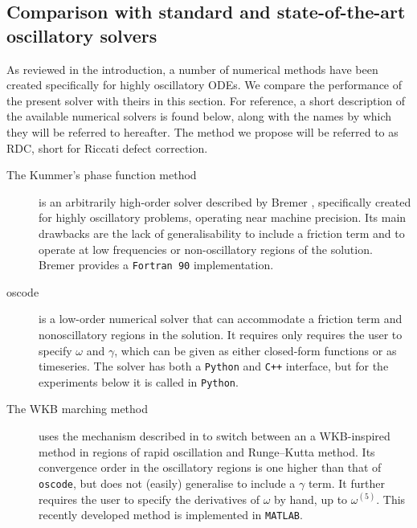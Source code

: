 \documentclass[10pt]{article}
\newcommand{\om}{\omega}
\newcommand{\g}{\gamma}
\newcommand{\AB}[1]{{\color{orange}#1}}
\begin{document}
\subsection{Comparison with standard and state-of-the-art oscillatory solvers \label{solvercomp}}

As reviewed in the introduction, a number of numerical methods have been
created specifically for highly oscillatory ODEs. We compare the performance of
the present solver with theirs in this section. For reference, a short
description of the available numerical solvers is found below, along with the
names by which they will be referred to hereafter. The method we propose will
be referred to as RDC, short for Riccati defect correction.
%
\begin{description}
\item[The Kummer's phase function method]{is an arbitrarily high-order solver
        described by Bremer \cite{bremer2018}, specifically created for highly
        oscillatory problems, operating near machine precision. Its main
        drawbacks are the lack of generalisability to include a friction term
        and to operate at low frequencies or non-oscillatory regions of the
        solution. Bremer provides a \texttt{Fortran 90} implementation.
        }
\item[oscode]   %
{is a low-order numerical solver
        \cite{agocs2020efficient,agocs2020dense} that can accommodate a
        friction term and nonoscillatory regions in the solution. It requires
        only requires the user to specify $\om$ and $\g$, which can be given as
        either closed-form functions or as timeseries. The solver has both a
        \texttt{Python} and \texttt{C++} interface, but for the experiments below it is called in
        \texttt{Python}.}
    \item[The WKB marching method]{\cite{arnold2011wkb,korner2022wkb} uses the
        mechanism described in \cite{agocs2020efficient} to switch between an a
        WKB-inspired method in regions of rapid oscillation and Runge--Kutta
        method. Its convergence order in the oscillatory regions is one higher
        than that of \texttt{oscode}, but does not (easily) generalise to
        include a $\g$ term. It further requires the user to specify the
        derivatives of $\om$ by hand, up to $\om^{(5)}$. This recently
        developed method is implemented in \texttt{MATLAB}.
    }
\end{description}
\end{document}
